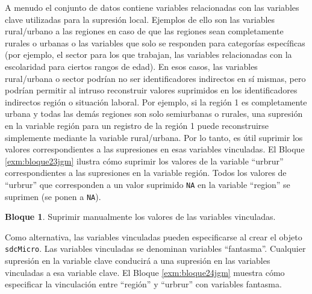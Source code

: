 \documentclass[]{book}
\newenvironment{Shaded}{\begin{snugshade}}{\end{snugshade}}
\newcommand{\CommentTok}[1]{\textcolor[rgb]{0.56,0.35,0.01}{\textit{#1}}}
\newcommand{\KeywordTok}[1]{\textcolor[rgb]{0.13,0.29,0.53}{\textbf{#1}}}
\newcommand{\NormalTok}[1]{#1}
\newcommand{\OperatorTok}[1]{\textcolor[rgb]{0.81,0.36,0.00}{\textbf{#1}}}
\newcommand{\OtherTok}[1]{\textcolor[rgb]{0.56,0.35,0.01}{#1}}
\newcommand{\StringTok}[1]{\textcolor[rgb]{0.31,0.60,0.02}{#1}}
\theoremstyle{definition}
\theoremstyle{definition}
\newtheorem{example}{Bloque}[chapter]
\theoremstyle{definition}
\theoremstyle{definition}
\theoremstyle{remark}
\begin{document}
A menudo el conjunto de datos contiene variables relacionadas con las variables clave utilizadas para la supresión local. Ejemplos de ello son las variables rural/urbano a las regiones en caso de que las regiones sean completamente rurales o urbanas o las variables que solo se responden para categorías específicas (por ejemplo, el sector para los que trabajan, las variables relacionadas con la escolaridad para ciertos rangos de edad). En esos casos, las variables rural/urbana o sector podrían no ser identificadores indirectos en sí mismas, pero podrían permitir al intruso reconstruir valores suprimidos en los identificadores indirectos región o situación laboral. Por ejemplo, si la región 1 es completamente urbana y todas las demás regiones son solo semiurbanas o rurales, una supresión en la variable región para un registro de la región 1 puede reconstruirse simplemente mediante la variable rural/urbana. Por lo tanto, es útil suprimir los valores correspondientes a las supresiones en esas variables vinculadas. El Bloque \ref{exm:bloque23jgm} ilustra cómo suprimir los valores de la variable ``urbrur'' correspondientes a las supresiones en la variable región. Todos los valores de ``urbrur'' que corresponden a un valor suprimido \texttt{NA} en la variable ``region'' se suprimen (se ponen a \texttt{NA}).

\begin{example}
\protect\hypertarget{exm:bloque23jgm}{}{\label{exm:bloque23jgm} }Suprimir manualmente los valores de las variables vinculadas.
\end{example}

\begin{Shaded}
\end{Shaded}

Como alternativa, las variables vinculadas pueden especificarse al crear el objeto \texttt{sdcMicro}. Las variables vinculadas se denominan variables ``fantasma''. Cualquier supresión en la variable clave conducirá a una supresión en las variables vinculadas a esa variable clave. El Bloque \ref{exm:bloque24jgm} muestra cómo especificar la vinculación entre ``región'' y ``urbrur'' con variables fantasma.
\end{document}
